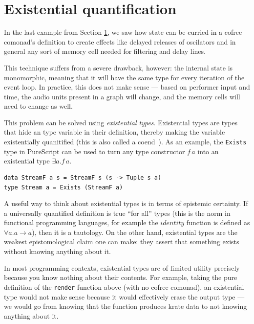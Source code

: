 \documentclass{article}
\begin{document}
\section{Existential quantification}
\label{sec:existential_quantification}

In the last example from Section \ref{sec:existential_quantification}, we saw how state can be curried in a cofree comonad's definition to create effects like delayed releases of oscilators and in general any sort of memory cell needed for filtering and delay lines.

This technique suffers from a severe drawback, however: the internal state is monomorphic, meaning that it will have the same type for every iteration of the event loop. In practice, this does not make sense --- based on performer input and time, the audio units present in a graph will change, and the memory cells will need to change as well.

This problem can be solved using \textit{existential types}. Existential types are types that hide an type variable in their definition, thereby making the variable existentially quanitified (this is also called a coend~\cite{yoneda1960ext}). As an example, the \texttt{Exists} type in PureScript can be used to turn any type constructor $f\,a$ into an existential type $\exists a. f\,a$.

\lstset{language=Haskell, style=psstyle}
\begin{lstlisting}
data StreamF a s = StreamF s (s -> Tuple s a)
type Stream a = Exists (StreamF a)
\end{lstlisting}

A useful way to think about existential types is in terms of epistemic certainty. If a universally quantified definition is true ``for all'' types (this is the norm in functional programming languages, for example the $identity$ function is defined as $\forall a. a \rightarrow a$), then it is a tautology. On the other hand, existential types are the weakest epistomological claim one can make: they assert that something exists without knowing anything about it.

In most programming contexts, existential types are of limited utility precisely because you know nothing about their contents. For example, taking the pure definition of the \texttt{render} function above (with no cofree comonad), an existential type would not make sense because it would effectively erase the output type --- we would go from knowing that the function produces krate data to not knowing anything about it.
\end{document}

